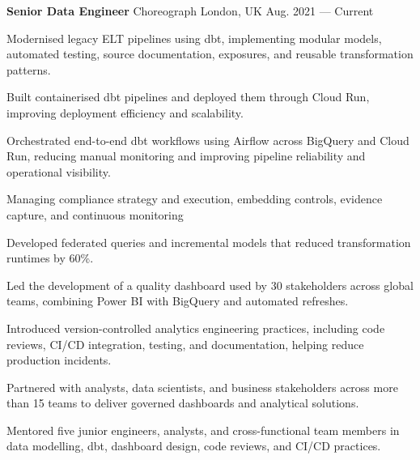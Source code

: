 
\begin{cventries}

  \cventry
  {\textbf{Senior Data Engineer}} %
  {{\color{awesome-nephritis}Choreograph} } %
  {London, UK} %
  {Aug. 2021 --- Current} %
  {
    \begin{cvitems} %
    \item { Modernised legacy ELT pipelines using dbt, implementing modular models, automated testing, source documentation, exposures, and reusable transformation patterns.}
    \item {Built containerised dbt pipelines and deployed them through Cloud Run, improving deployment efficiency and scalability.}
    \item {Orchestrated end-to-end dbt workflows using Airflow across BigQuery and Cloud Run, reducing manual monitoring and improving pipeline reliability and operational visibility.}
    \item {Managing  compliance strategy and execution, embedding controls, evidence capture, and continuous monitoring}
    \item {Developed federated queries and incremental models that reduced transformation runtimes by 60\%.}
    \item {Led the development of a quality dashboard used by 30 stakeholders across global teams, combining Power BI with BigQuery and automated refreshes.}
    \item {Introduced version-controlled analytics engineering practices, including code reviews, CI/CD integration, testing, and documentation, helping reduce production incidents.}
    \item {Partnered with analysts, data scientists, and business stakeholders across more than 15 teams to deliver governed dashboards and analytical solutions.}
    \item {Mentored five junior engineers, analysts, and cross-functional team members in data modelling, dbt, dashboard design, code reviews, and CI/CD practices.}
    \end{cvitems}
  }


\end{cventries}
